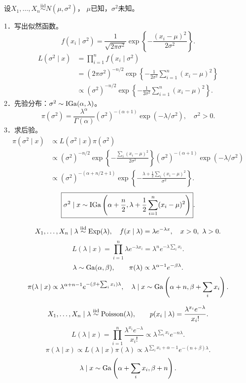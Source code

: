 设$X_1,\ldots,X_n\overset{\mathrm{iid}}{\sim}N(\mu,\sigma^2)$，
$\mu$已知，$\sigma^2$未知。

1．写出似然函数。
\[
f(x_i\mid\sigma^2)=\frac1{\sqrt{2\pi\sigma^2}}
\exp\left\{-\frac{(x_i-\mu)^2}{2\sigma^2}\right\}.
\]
\begin{align*}
L(\sigma^2\mid x)
&=\prod_{i=1}^n f(x_i\mid\sigma^2)\\
&=(2\pi\sigma^2)^{-n/2}
\exp\left\{-\frac1{2\sigma^2}\sum_{i=1}^n(x_i-\mu)^2\right\}\\
&\propto(\sigma^2)^{-n/2}
\exp\left\{-\frac1{2\sigma^2}\sum_{i=1}^n(x_i-\mu)^2\right\}.
\end{align*}
2．先验分布：$\sigma^2\sim\operatorname{IGa}(\alpha,\lambda)$。
\[
\pi(\sigma^2)=\frac{\lambda^\alpha}{\Gamma(\alpha)}
(\sigma^2)^{-(\alpha+1)}\exp(-\lambda/\sigma^2),\quad\sigma^2>0.
\]
3．求后验。
\begin{align*}
\pi(\sigma^2\mid x)
&\propto L(\sigma^2\mid x)\pi(\sigma^2)\\
&\propto(\sigma^2)^{-n/2}
\exp\left\{-\frac{\sum_i(x_i-\mu)^2}{2\sigma^2}\right\}
(\sigma^2)^{-(\alpha+1)}\exp(-\lambda/\sigma^2)\\
&\propto(\sigma^2)^{-(\alpha+n/2+1)}
\exp\left\{-\frac{\lambda+\frac12\sum_i(x_i-\mu)^2}{\sigma^2}\right\}.
\end{align*}
\[
\boxed{\sigma^2\mid x\sim
\operatorname{IGa}\left(\alpha+\frac n2,\lambda+\frac12\sum_{i=1}^n(x_i-\mu)^2\right)}.
\]

\[
X_1,\ldots,X_n\mid\lambda\overset{\mathrm{iid}}{\sim}\Exp(\lambda),
\quad f(x\mid\lambda)=\lambda e^{-\lambda x},\quad x>0,\ \lambda>0.
\]
\[
L(\lambda\mid x)=\prod_{i=1}^n\lambda e^{-\lambda x_i}
=\lambda^n e^{-\lambda\sum_i x_i}.
\]
\[
\lambda\sim\operatorname{Ga}(\alpha,\beta),\qquad
\pi(\lambda)\propto\lambda^{\alpha-1}e^{-\beta\lambda}.
\]
\[
\pi(\lambda\mid x)\propto
\lambda^{\alpha+n-1}e^{-(\beta+\sum_i x_i)\lambda},
\quad
\lambda\mid x\sim\operatorname{Ga}\left(\alpha+n,\beta+\sum_i x_i\right).
\]

\[
X_1,\ldots,X_n\mid\lambda\overset{\mathrm{iid}}{\sim}\operatorname{Poisson}(\lambda),
\qquad p(x_i\mid\lambda)=\frac{\lambda^{x_i}e^{-\lambda}}{x_i!}.
\]
\[
L(\lambda\mid x)=\prod_{i=1}^n\frac{\lambda^{x_i}e^{-\lambda}}{x_i!}
\propto\lambda^{\sum_i x_i}e^{-n\lambda}.
\]
\[
\pi(\lambda\mid x)\propto L(\lambda\mid x)\pi(\lambda)
\propto\lambda^{\sum_i x_i+\alpha-1}e^{-(n+\beta)\lambda}.
\]
\[
\lambda\mid x\sim\operatorname{Ga}\left(\alpha+\sum_i x_i,\beta+n\right).
\]
